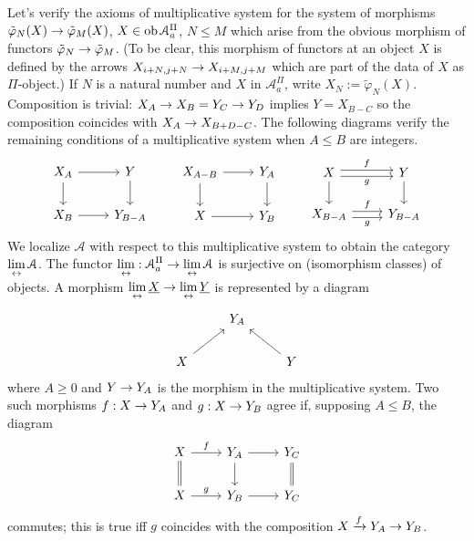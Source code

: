 \documentclass[deligne.tex]{subfiles}
\begin{document}
Let's verify the axioms of multiplicative system for the system of morphisms
$\tilde\varphi_N(X)\rightarrow\tilde\varphi_M(X)$, $X\in\operatorname{ob}\mathcal A^\Pi_a$,
$N\leq M$ which arise from the obvious morphism of functors
$\tilde\varphi_N\rightarrow\tilde\varphi_M$.
(To be clear, this morphism of functors at an object $X$ is defined by the
arrows $X_{i+N,j+N}\rightarrow X_{i+M,j+M}$ which are part of the data of $X$ as
$\Pi$-object.) If $N$ is a natural number and $X$ in $\mathcal A_a^\Pi$,
write $X_N:=\tilde\varphi_N(X)$.
Composition is trivial: $X_A\rightarrow X_B=Y_C\rightarrow Y_D$
implies $Y=X_{B-C}$ so the composition coincides with $X_A\rightarrow X_{B+D-C}$.
The following diagrams verify the remaining conditions of a multiplicative
system when $A\leq B$ are integers.
\begin{equation*}\begin{tikzcd}
	X_A\arrow[r]\arrow[d]&Y\arrow[d] \\
	X_B\arrow[r]&Y_{B-A}
\end{tikzcd}\qquad\begin{tikzcd}
	X_{A-B}\arrow[r]\arrow[d]&Y_A\arrow[d] \\
	X\arrow[r]&Y_B
\end{tikzcd}\qquad\begin{tikzcd}
	X\arrow[r,"f",shift left]\arrow[r,"g"',shift right]\arrow[d]&Y\arrow[d]\\
	X_{B-A}\arrow[r,"f",shift left]\arrow[r,"g"',shift right]&Y_{B-A}
\end{tikzcd}\end{equation*}
We localize $\mathcal A$ with respect to this multiplicative system to 
obtain the category $\displaystyle\lim_{\leftrightarrow}\mathcal A$.
The functor $\displaystyle\lim_{\leftrightarrow}:\mathcal A_a^\Pi\rightarrow\displaystyle\lim_{\leftrightarrow}\mathcal A$ is 
surjective on (isomorphism classes) of objects. A morphism
$\displaystyle\lim_{\leftrightarrow}\underline X\rightarrow\displaystyle\lim_{\leftrightarrow}\underline Y$ is represented by a diagram
\begin{equation*}\begin{tikzcd}
	&Y_A \\
	X\arrow[ur]&&Y\arrow[ul]
\end{tikzcd}\end{equation*}
where $A\geq0$ and $Y\rightarrow Y_A$ is the morphism in the multiplicative system.
Two such morphisms $f:X\rightarrow Y_A$ and $g:X\rightarrow Y_B$ agree if, supposing
$A\leq B$, the diagram
\begin{equation*}\begin{tikzcd}
	X\arrow[d,equals]\arrow[r,"f"]&Y_A\arrow[d]\arrow[r]&Y_C\arrow[d,equals] \\
	X\arrow[r,"g"]&Y_B\arrow[r]&Y_C
\end{tikzcd}\end{equation*}
commutes; this is true iff $g$ coincides with the composition
$X\xrightarrow f Y_A\rightarrow Y_B$.
\end{document}
